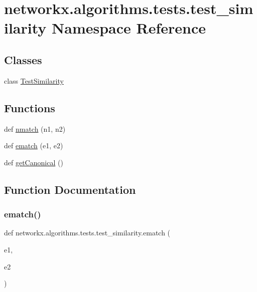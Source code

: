 \hypertarget{namespacenetworkx_1_1algorithms_1_1tests_1_1test__similarity}{}\section{networkx.\+algorithms.\+tests.\+test\+\_\+similarity Namespace Reference}
\label{namespacenetworkx_1_1algorithms_1_1tests_1_1test__similarity}
\subsection*{Classes}
\begin{DoxyCompactItemize}
\item 
class \hyperlink{classnetworkx_1_1algorithms_1_1tests_1_1test__similarity_1_1TestSimilarity}{Test\+Similarity}
\end{DoxyCompactItemize}
\subsection*{Functions}
\begin{DoxyCompactItemize}
\item 
def \hyperlink{namespacenetworkx_1_1algorithms_1_1tests_1_1test__similarity_afa46fd61e1b93d352b5d5107f690fe19}{nmatch} (n1, n2)
\item 
def \hyperlink{namespacenetworkx_1_1algorithms_1_1tests_1_1test__similarity_aa07ddfcc5c45db7c90db869fffcb1a74}{ematch} (e1, e2)
\item 
def \hyperlink{namespacenetworkx_1_1algorithms_1_1tests_1_1test__similarity_ac1e1f68da4931efa1d2df04bd87e6eb0}{get\+Canonical} ()
\end{DoxyCompactItemize}


\subsection{Function Documentation}
\mbox{\label{namespacenetworkx_1_1algorithms_1_1tests_1_1test__similarity_aa07ddfcc5c45db7c90db869fffcb1a74}} 
\subsubsection{\texorpdfstring{ematch()}{ematch()}}
{\footnotesize\ttfamily def networkx.\+algorithms.\+tests.\+test\+\_\+similarity.\+ematch (\begin{DoxyParamCaption}\item[{}]{e1,  }\item[{}]{e2 }\end{DoxyParamCaption})}

